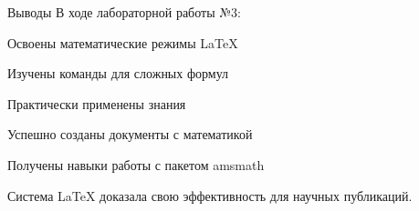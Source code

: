 \begin{frame}{Выводы}
\label{ux432ux44bux432ux43eux434ux44b}
В ходе лабораторной работы №3:

Освоены математические режимы LaTeX

Изучены команды для сложных формул

Практически применены знания

Успешно созданы документы с математикой

Получены навыки работы с пакетом amsmath

Система LaTeX доказала свою эффективность для научных публикаций.
\end{frame}
